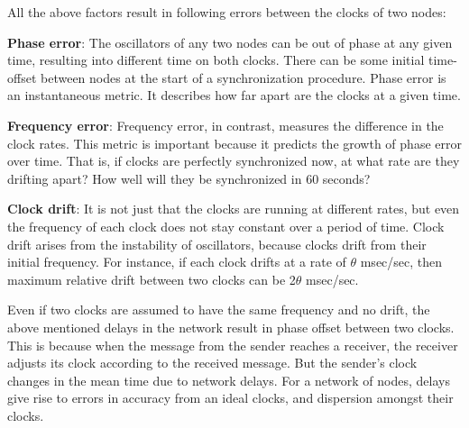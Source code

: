 \documentclass[a4paper,10pt]{report}
\begin{document}
      All the above factors result in following errors between the clocks of two nodes:
\begin{description}
\item \textbf{Phase error}: The oscillators of any two nodes can be out of phase at
any given time, resulting into different time on both clocks. There
can be some initial time-offset between nodes at the start of a
synchronization procedure. Phase error is an instantaneous metric.
It describes how far apart are the clocks at a given time.
\item \textbf{Frequency error}: Frequency error, in contrast, measures the difference in the clock
rates. This metric is important because it predicts the growth of
phase error over time. That is, if clocks are perfectly synchronized
now, at what rate are they drifting apart? How well will they be
synchronized in 60 seconds?
\item \textbf{Clock drift}: It is not just that the clocks are running at different rates, but even
the frequency of each clock does not stay constant over a period of
time. Clock drift arises from the instability of oscillators,
because clocks drift from their initial frequency. For instance, if
each clock drifts at a rate of $\theta$ msec/sec, then maximum
relative drift between two clocks can be 2$\theta$ msec/sec.
\end{description}
Even if two clocks are assumed to have the same frequency and no
drift, the above mentioned delays in the network result in phase
offset between two clocks. This is because when the message from the
sender reaches a receiver, the receiver adjusts its clock according
to the received message. But the sender's clock changes in the mean
time due to network delays. For a network of nodes, delays give rise
to errors in accuracy from an ideal clocks, and dispersion amongst
their clocks.
\end{document}
